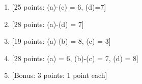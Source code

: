 \documentclass[11pt]{article}
\begin{document}
\begin{enumerate}

\item {[25 points: (a)-(c) = 6, (d)=7]}
\vspace*{.5em}


\newpage
\item {[28 points: (a)-(d) = 7]}
\vspace*{.5em}


%

\newpage
\item {[19 points: (a)-(b) = 8, (c) = 3]}
\vspace*{.5em}


\newpage
\item {[28 points: (a) = 6, (b)-(c) = 7, (d) = 8]}
\vspace*{.5em}


\newpage
\item {[Bonus: 3 points: 1 point each]}
\vspace*{.5em}


\end{enumerate}
\end{document}
